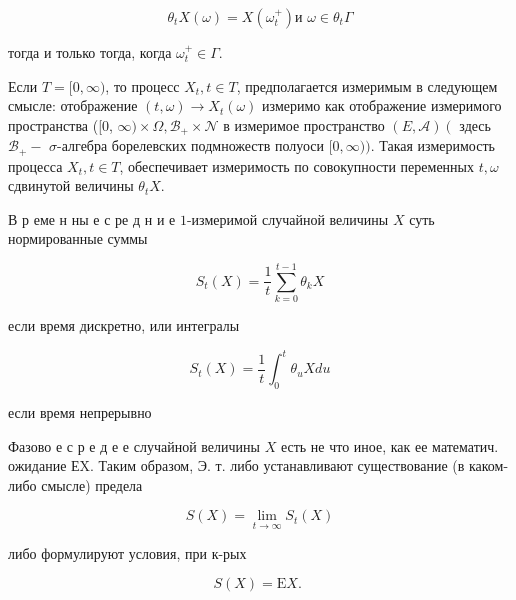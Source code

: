 \documentclass[10pt]{article}
\begin{document}
\[

\theta_{t} X(\omega)=X\left(\omega_{t}^{+}\right) \text {и } \omega \in \theta_{t} \Gamma

\]



тогда и только тогда, когда $\omega_{t}^{+} \in \Gamma$.



Если $T=[0, \infty)$, то процесс $X_{t}, t \in T$, предполагается измеримым в следующем смысле: отображение $(t, \omega) \rightarrow X_{t}(\omega)$ измеримо как отображение измеримого пространства ([0, $\infty) \times \Omega, \mathscr{B}_{+} \times \mathscr{\mathcal { N }}$ в измеримое пространство $(E, \mathscr{A})\left(\right.$ здесь $\mathscr{B}_{+}-$ $\sigma$-алгебра борелевских подмножеств полуоси $[0, \infty))$. Такая измеримость процесса $X_{t}, t \in T$, обеспечивает измеримость по совокупности переменных $t, \omega$ сдвинутой величины $\theta_{t} X$.



В р еме н ны е с ре д н и е $\mathfrak{1}$-измеримой случайной величины $X$ суть нормированные суммы



\[

S_{t}(X)=\frac{1}{t} \sum_{k=0}^{t-1} \theta_{k} X

\]



если время дискретно, или интегралы



\[

S_{t}(X)=\frac{1}{t} \int_{0}^{t} \theta_{u} X d u

\]



если время непрерывно



Фазово е с р е д е е случайной величины $X$ есть не что иное, как ее математич. ожидание ЕX. Таким образом, Э. т. либо устанавливают существование (в каком-либо смысле) предела



\[

S(X)=\lim _{t \rightarrow \infty} S_{t}(X)

\]



либо формулируют условия, при к-рых



\[

S(X)=\mathrm{E} X \text {. }

\]
\end{document}

